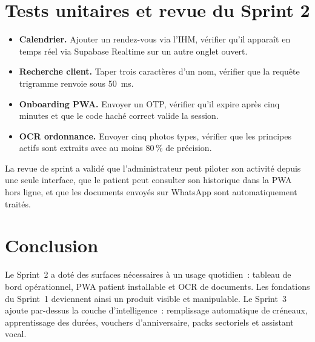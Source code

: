 \section{Tests unitaires et revue du Sprint 2}
\begin{itemize}
  \item \textbf{Calendrier.} Ajouter un rendez-vous via l'IHM,
        vérifier qu'il apparaît en temps réel via Supabase
        Realtime sur un autre onglet ouvert.
  \item \textbf{Recherche client.} Taper trois caractères d'un
        nom, vérifier que la requête trigramme renvoie sous 50~ms.
  \item \textbf{Onboarding PWA.} Envoyer un OTP, vérifier qu'il
        expire après cinq minutes et que le code haché correct
        valide la session.
  \item \textbf{OCR ordonnance.} Envoyer cinq photos types,
        vérifier que les principes actifs sont extraits avec au
        moins 80\,\% de précision.
\end{itemize}

La revue de sprint a validé que l'administrateur peut piloter son
activité depuis une seule interface, que le patient peut consulter
son historique dans la PWA hors ligne, et que les documents envoyés
sur WhatsApp sont automatiquement traités.

\section{Conclusion}
Le Sprint~2 a doté \nova{} des surfaces nécessaires à un usage
quotidien~: tableau de bord opérationnel, PWA patient installable
et OCR de documents. Les fondations du Sprint~1 deviennent ainsi
un produit visible et manipulable. Le Sprint~3 ajoute par-dessus
la couche d'intelligence~: remplissage automatique de créneaux,
apprentissage des durées, vouchers d'anniversaire, packs
sectoriels et assistant vocal.
